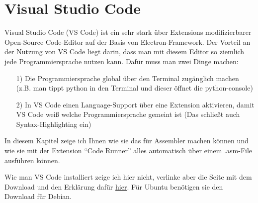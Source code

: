 \section{Visual Studio Code}
\label{sec:vsCode}
Visual Studio Code (VS Code) ist ein sehr stark über Extensions modifizierbarer Open-Source Code-Editor auf der Basis von Electron-Framework. Der Vorteil an der Nutzung von VS Code liegt darin, dass man mit diesem Editor so ziemlich jede Programmiersprache nutzen kann. Dafür muss man zwei Dinge machen:
\begin{itemize}
    \item[1)] Die Programmiersprache global über den Terminal zugänglich machen (z.B. man tippt {\ttfamily python} in den Terminal und dieser öffnet die {\ttfamily python-console})
    \item[2)] In VS Code einen Language-Support über eine Extension aktivieren, damit VS Code weiß welche Programmiersprache gemeint ist (Das schließt auch Syntax-Highlighting ein)
\end{itemize}
In diesem Kapitel zeige ich Ihnen wie sie das für Assembler machen können und wie sie mit der Extension \enquote{Code Runner} alles automatisch über einem {\ttfamily .asm}-File ausführen können.

Wie man VS Code installiert zeige ich hier nicht, verlinke aber die Seite mit dem Download und den Erklärung dafür \href{https://code.visualstudio.com/download}{hier}. Für Ubuntu benötigen sie den Download für Debian.

